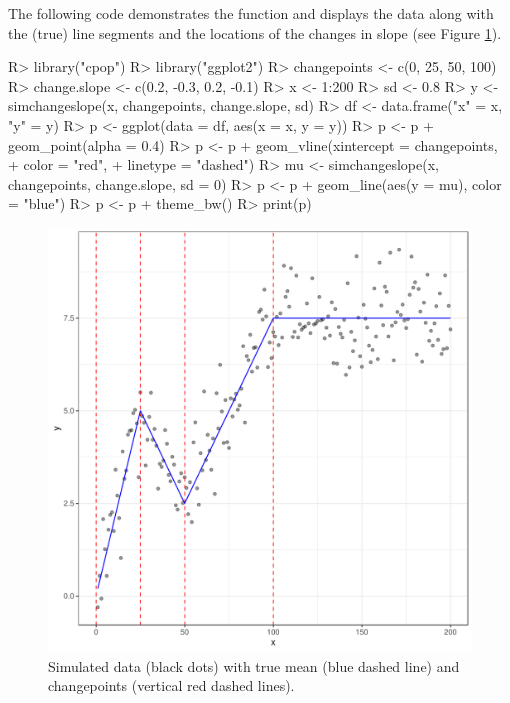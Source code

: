 \documentclass[nojss]{jss}
\begin{document}
The following code demonstrates the  function and displays the data along with the (true) line segments and the locations of the changes in slope (see Figure \ref{fig:simulate-example}).
\begin{CodeChunk}
\begin{CodeInput}
R> library("cpop")
R> library("ggplot2")
R> changepoints <- c(0, 25, 50, 100)
R> change.slope <- c(0.2, -0.3, 0.2, -0.1)
R> x <- 1:200
R> sd <- 0.8
R> y <- simchangeslope(x, changepoints, change.slope, sd)
R> df <- data.frame("x" = x, "y" = y)
R> p <- ggplot(data = df, aes(x = x, y = y))
R> p <- p + geom_point(alpha = 0.4)
R> p <- p + geom_vline(xintercept = changepoints,
+                      color = "red",
+                      linetype = "dashed")
R> mu <- simchangeslope(x, changepoints, change.slope, sd = 0)
R> p <- p + geom_line(aes(y = mu), color = "blue")
R> p <- p + theme_bw()
R> print(p)
\end{CodeInput}
\end{CodeChunk}
%
%
\begin{figure}
\centering
\includegraphics[width=0.6\linewidth]{figures/simulate_example_ggplot.pdf}
\caption{Simulated data (black dots) with true mean (blue dashed line) and changepoints (vertical red dashed lines).}
\label{fig:simulate-example}
\end{figure}
%
%
\end{document}
